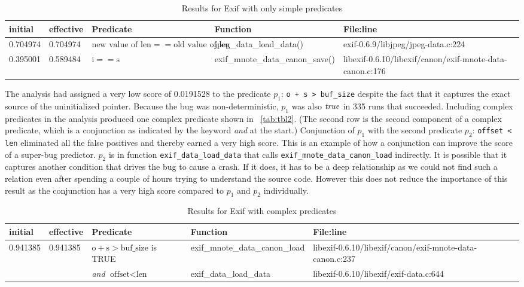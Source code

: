 \begin{table*}
\caption{Results for Exif with only simple predicates}
\label{tab:tbl1}
\centering
\scriptsize
\begin{tabular}{lllll}
\toprule
initial & effective & Predicate & Function & File:line \\
\midrule
0.704974 & 0.704974 & $\text{new value of len} == \text{old value of len}$ & jpeg\_data\_load\_data() & exif-0.6.9/libjpeg/jpeg-data.c:224 \\
0.395001 & 0.589484 & $\text{i} == \text{s}$ & exif\_mnote\_data\_canon\_save() & libexif-0.6.10/libexif/canon/exif-mnote-data-canon.c:176 \\
\bottomrule
\end{tabular}
\end{table*}

The analysis had assigned a very low score of 0.0191528 to the predicate $p_1$: \texttt{o + s > buf\_size} despite the fact that it captures the exact source of the uninitialized pointer.  Because the bug was non-deterministic, $p_1$ was also $\mathit{true}$ in 335 runs that succeeded.  Including complex predicates in the analysis produced one complex predicate shown in ~\autoref{tab:tbl2}.  (The second row is the second component of a complex predicate, which is a conjunction as indicated by the keyword \emph{and} at the start.)  Conjunction of $p_1$ with the second predicate $p_2$: \texttt{offset < len} eliminated all the false positives and thereby earned a very high score.  This is an example of how a conjunction can improve the score of a super-bug predictor.  $p_2$ is in function \texttt{exif\_data\_load\_data} that calls \texttt{exif\_mnote\_data\_canon\_load} indirectly.  It is possible that it captures another condition that drives the bug to cause a crash.  If it does, it has to be a deep relationship as we could not find such a relation even after spending a couple of hours trying to understand the source code.  However this does not reduce the importance of this result as the conjunction has a very high score compared to $p_1$ and $p_2$ individually.

\begin{table*}
\caption{Results for Exif with complex predicates}
\label{tab:tbl2}
\centering
\scriptsize
\begin{tabular}{lllll}
\toprule
initial & effective & Predicate & Function & File:line \\
\midrule
0.941385 & 0.941385 & $\text{o} + \text{s} > \text{buf\_size}$ is TRUE & exif\_mnote\_data\_canon\_load &
 libexif-0.6.10/libexif/canon/exif-mnote-data-canon.c:237 \\

         &          & \emph{and} $\text{offset} < \text{len}$ & exif\_data\_load\_data & libexif-0.6.10/libexif/exif-data.c:644 \\
\bottomrule
\end{tabular}
\end{table*}

